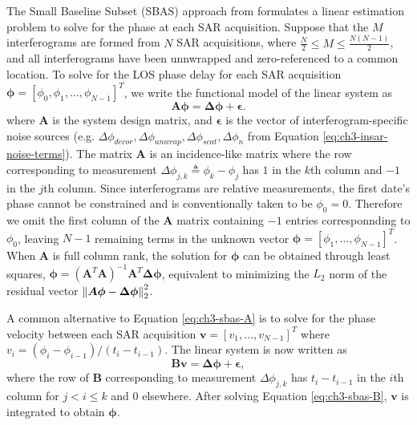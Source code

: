 


The Small Baseline Subset (SBAS) approach from \cite{Berardino2002NewAlgorithmSurface} formulates a linear estimation problem to solve for the phase at each SAR acquisition.
Suppose that the $M$ interferograms are formed from $N$ SAR acquisitions, where $ \frac{N}{2} \leq M \leq \frac{N(N - 1)}{2} $, and all interferograms have been unnwrapped and zero-referenced to a common location.
To solve for the LOS phase delay for each SAR acquisition $ \bm{\phi} = \left[\phi_0, \phi_1, \ldots, \phi_{N-1} \right]^T $, 
we write the functional model of the linear system as
\begin{equation}
	\bm{A \phi} = \bm{\Delta \phi} + \bm{\epsilon} . \label{eq:ch3-sbas-A}
\end{equation}
where  $\bm{A}$ is the system design matrix, and $ \bm{\epsilon}  $ is the vector of interferogram-specific noise sources (e.g. $ \Delta \phi_{decor}, \Delta \phi_{unwrap}, \Delta \phi_{scat}, \Delta \phi_{n} $ from Equation \eqref{eq:ch3-insar-noise-terms}).
The matrix $\bm{A}$ is an incidence-like matrix where the row corresponding to measurement $ \Delta \phi_{j,k} \triangleq \phi_k - \phi_j $ has $1$ in the $k$th column and $-1$ in the $j$th column.
Since interferograms are relative measurements, the first date's phase cannot be constrained and is conventionally taken to be $\phi_0 = 0$. Therefore we omit the first column of the $ \bm{A} $ matrix containing $-1$ entries corresponnding to $\phi_0$, leaving $N-1$ remaining terms in the unknown vector $ \bm{\phi} = \left[\phi_1, \ldots, \phi_{N-1} \right]^T $.
When $ \bm{A} $ is full column rank, the solution for $ \bm{\phi} $ can be obtained through least squares, $ \bm{\phi} = (\bm{A}^T \bm{A})^{-1}\bm{A}^T \bm{\Delta \phi}
 $, equivalent to minimizing the $L_2$ norm of the residual vector $\left\lVert\bm{A \phi} - \bm{\Delta \phi}\right\rVert^2_2 $.

A common alternative to Equation \eqref{eq:ch3-sbas-A} is to solve for the phase velocity between each SAR acquisition $\bm{v} = [v_1, \ldots, v_{N-1}]^T$ where $ v_i = (\phi_i - \phi_{i-1})/(t_i - t_{i-1} ) $.
The linear system is now written as
\begin{equation}
	\bm{B v} = \bm{\Delta \phi} + \bm{\epsilon}, \label{eq:ch3-sbas-B}
\end{equation}
where the row of $\bm{B}$
corresponding to measurement $ \Delta \phi_{j,k} $ has $t_i - t_{i-1}$ in the $i$th column for $j < i \leq k$ and 0 elsewhere. 
After solving Equation \eqref{eq:ch3-sbas-B}, $ \bm{v} $ is integrated to obtain $ \bm{\phi} $.

